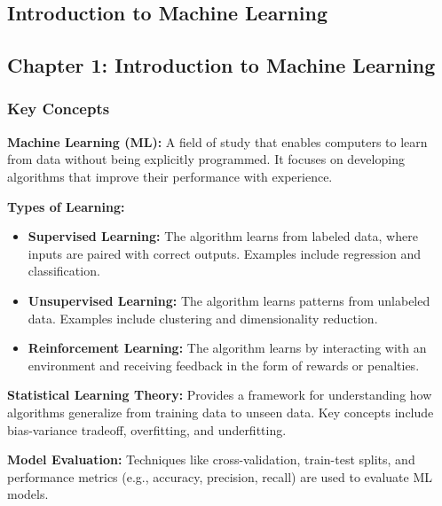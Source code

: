 \begin{notechapter}
\chapter{Introduction to Machine Learning}\label{ch:intro-to-ml}

\section{Chapter 1: Introduction to Machine Learning}

\subsection{Key Concepts}
\textbf{Machine Learning (ML):} A field of study that enables computers to learn from data without being explicitly programmed. It focuses on developing algorithms that improve their performance with experience.

\vspace{0.5em}
\textbf{Types of Learning:}
\begin{itemize}
    \item \textbf{Supervised Learning:} The algorithm learns from labeled data, where inputs are paired with correct outputs. Examples include regression and classification.
    \item \textbf{Unsupervised Learning:} The algorithm learns patterns from unlabeled data. Examples include clustering and dimensionality reduction.
    \item \textbf{Reinforcement Learning:} The algorithm learns by interacting with an environment and receiving feedback in the form of rewards or penalties.
\end{itemize}

\vspace{0.5em}
\textbf{Statistical Learning Theory:} Provides a framework for understanding how algorithms generalize from training data to unseen data. Key concepts include bias-variance tradeoff, overfitting, and underfitting.

\vspace{0.5em}
\textbf{Model Evaluation:} Techniques like cross-validation, train-test splits, and performance metrics (e.g., accuracy, precision, recall) are used to evaluate ML models.


\end{notechapter}
